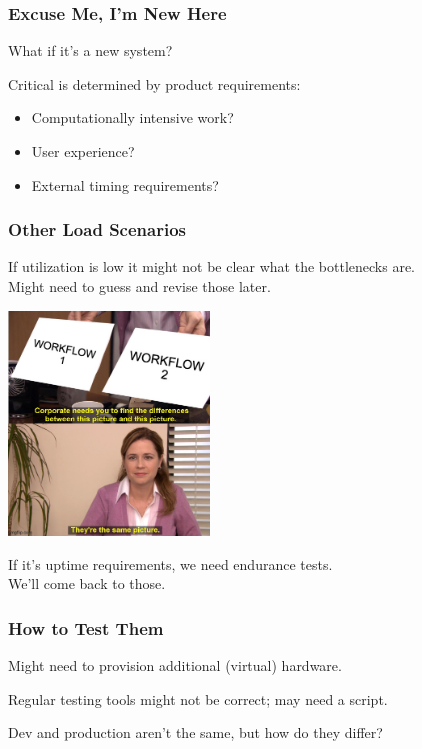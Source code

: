 \begin{frame}
\frametitle{Excuse Me, I'm New Here}

What if it's a new system?

Critical is determined by product requirements:\\
\begin{itemize}
	\item Computationally intensive work?
	\item User experience?
	\item External timing requirements?
\end{itemize}

\end{frame}

\begin{frame}
\frametitle{Other Load Scenarios}

If utilization is low it might not be clear what the bottlenecks are.\\
\quad Might need to guess and revise those later.

\begin{center}
  \includegraphics[width=0.4\textwidth]{images/workflow.jpg}
\end{center}

If it's uptime requirements, we need endurance tests.\\
\quad We'll come back to those.

\end{frame}

\begin{frame}
\frametitle{How to Test Them}
Might need to provision additional (virtual) hardware.

Regular testing tools might not be correct; may need a script.

Dev and production aren't the same, but how do they differ?

\end{frame}

